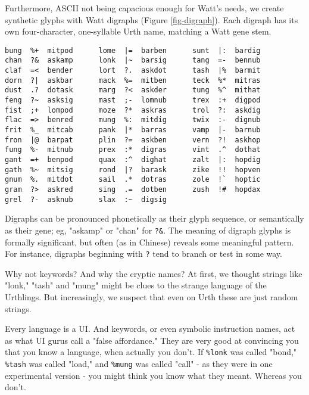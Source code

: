 \documentclass[10pt, nocopyrightspace]{sigplanconf}
\begin{document}
Furthermore, ASCII not being capacious enough for Watt's needs,
we create synthetic glyphs with Watt digraphs (Figure
\ref{fig-digraph}).  Each digraph has its own four-character,
one-syllable Urth name, matching a Watt gene stem.

\begin{figure*}
\begin{center}
\makebox[\textwidth]{\hrulefill}
\begin{verbatim}
bung  %+  mitpod      lome  |=  barben      sunt  |:  bardig
chan  ?&  askamp      lonk  |~  barsig      tang  =-  bennub
claf  =<  bender      lort  ?.  askdot      tash  |%  barmit
dorn  ?|  askbar      mack  %=  mitben      teck  %*  mitras
dust  .?  dotask      marg  ?<  askder      tung  %^  mithat
feng  ?~  asksig      mast  ;-  lomnub      trex  :+  digpod
fist  ;+  lompod      moze  ?*  askras      trol  ?:  askdig
flac  =>  benred      mung  %:  mitdig      twix  :-  dignub
frit  %_  mitcab      pank  |*  barras      vamp  |-  barnub
fron  |@  barpat      plin  ?=  askben      vern  ?!  askhop
fung  %-  mitnub      prex  :*  digras      vint  .^  dothat
gant  =+  benpod      quax  :^  dighat      zalt  |:  hopdig
gath  %~  mitsig      rond  |?  barask      zike  !!  hopven
gnum  %.  mitdot      sail  .*  dotras      zole  !`  hoptic
gram  ?>  askred      sing  .=  dotben      zush  !#  hopdax
grel  ?-  asknub      slax  :~  digsig    
\end{verbatim}
\end{center}
\caption{Urth digraphs}
\label{fig-digraph}
\end{figure*}

Digraphs can be pronounced phonetically as their glyph sequence,
or semantically as their gene; eg, "askamp" or "chan" for
\verb|?&|.  The meaning of digraph glyphs is formally
significant, but often (as in Chinese) reveals some meaningful
pattern.  For instance, digraphs beginning with \verb|?| tend to
branch or test in some way.

Why not keywords?  And why the cryptic names?  At first, we
thought strings like "lonk," "tash" and "mung" might be clues to
the strange language of the Urthlings.  But increasingly, we 
suspect that even on Urth these are just random strings.

Every language is a UI.  And keywords, or even symbolic
instruction names, act as what UI gurus call a "false
affordance."  They are very good at convincing you that you know
a language, when actually you don't.  If \verb|%lonk| was called
"bond," \verb|%tash| was called "load," and \verb|%mung| was
called "call" - as they were in one experimental version - you
might think you know what they meant.  Whereas you don't.
\end{document}
